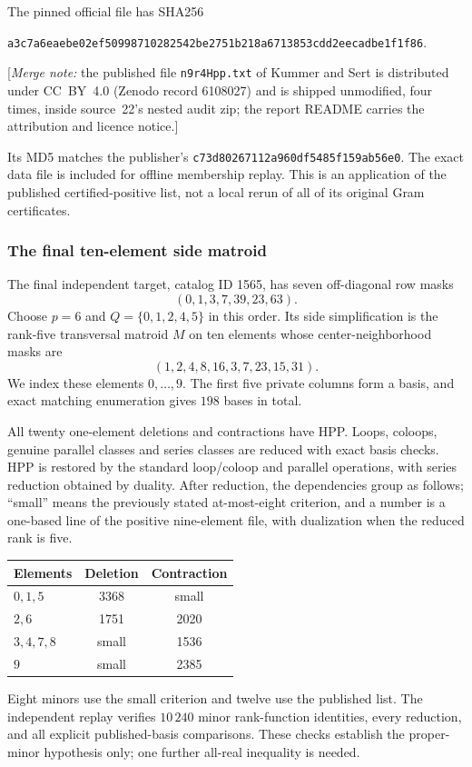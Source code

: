 \documentclass[11pt]{article}
\numberwithin{equation}{section}
\theoremstyle{definition}\newtheorem{definition}[theorem]{Definition}\newtheorem{remark}[theorem]{Remark}
\newcommand{\mnote}[1]{[\textit{Merge note:} #1]}
\begin{document}
The pinned official file has SHA256
\begin{center}\footnotesize\texttt{a3c7a6eaebe02ef50998710282542be2751b218a6713853cdd2eecadbe1f1f86}.\end{center}

\mnote{the published file \texttt{n9r4Hpp.txt} of Kummer and Sert is
distributed under CC~BY~4.0 (Zenodo record 6108027) and is shipped
unmodified, four times, inside source~22's nested audit zip; the report
README carries the attribution and licence notice.}

Its MD5 matches the publisher's \texttt{c73d80267112a960df5485f159ab56e0}. The exact data file is included for offline membership replay. This is an application of the published certified-positive list, not a local rerun of all of its original Gram certificates.

\subsubsection{The final ten-element side matroid}\label{pgr:r:ir:sec:last}
The final independent target, catalog ID 1565, has seven off-diagonal row masks
\begin{equation}\label{pgr:r:ir:eq:lastrows}
 (0,1,3,7,39,23,63).
\end{equation}
Choose $p=6$ and $Q=\{0,1,2,4,5\}$ in this order. Its side simplification is the rank-five transversal matroid $M$ on ten elements whose center-neighborhood masks are
\begin{equation}\label{pgr:r:ir:eq:lastmasks}
 (1,2,4,8,16,3,7,23,15,31).
\end{equation}
We index these elements $0,\ldots,9$. The first five private columns form a basis, and exact matching enumeration gives $198$ bases in total.

All twenty one-element deletions and contractions have HPP. Loops, coloops, genuine parallel classes and series classes are reduced with exact basis checks. HPP is restored by the standard loop/coloop and parallel operations, with series reduction obtained by duality. After reduction, the dependencies group as follows; ``small'' means the previously stated at-most-eight criterion, and a number is a one-based line of the positive nine-element file, with dualization when the reduced rank is five.
\begin{center}
\begin{tabular}{lcc}
\toprule Elements&Deletion&Contraction\\\midrule
$0,1,5$&3368&small\\
$2,6$&1751&2020\\
$3,4,7,8$&small&1536\\
$9$&small&2385\\\bottomrule
\end{tabular}
\end{center}
Eight minors use the small criterion and twelve use the published list. The independent replay verifies $10\,240$ minor rank-function identities, every reduction, and all explicit published-basis comparisons. These checks establish the proper-minor hypothesis only; one further all-real inequality is needed.
\end{document}
